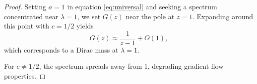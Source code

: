 \begin{proof}
Setting $a = 1$ in equation \eqref{eq:universal} and seeking a spectrum concentrated near $\lambda = 1$, we set $G(z)$ near the pole at $z = 1$. Expanding around this point with $c = 1/2$ yields
\[
G(z) \approx \frac{1}{z - 1} + O(1),
\]
which corresponds to a Dirac mass at $\lambda = 1$.

For $c \neq 1/2$, the spectrum spreads away from $1$, degrading gradient flow properties.
\end{proof}
